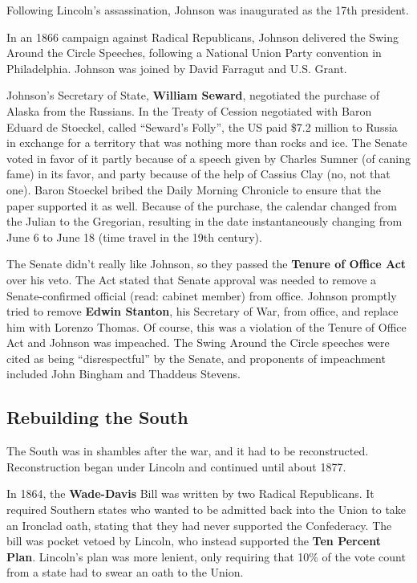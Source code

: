 Following Lincoln's assassination, Johnson was inaugurated as the 17th president.

In an 1866 campaign against Radical Republicans,
Johnson delivered the Swing Around the Circle Speeches,
following a National Union Party convention in Philadelphia.
Johnson was joined by David Farragut and U.S. Grant.

Johnson's Secretary of State, \textbf{William Seward}, negotiated the purchase of Alaska from the Russians.
In the Treaty of Cession negotiated with Baron Eduard de Stoeckel, called ``Seward's Folly'',
the US paid \$7.2 million to Russia in exchange for a territory that was nothing more than rocks and ice.
The Senate voted in favor of it
partly because of a speech given by Charles Sumner (of caning fame) in its favor,
and party because of the help of Cassius Clay (no, not that one).
Baron Stoeckel bribed the Daily Morning Chronicle to ensure that the paper supported it as well.
Because of the purchase, the calendar changed from the Julian to the Gregorian,
resulting in the date instantaneously changing from June 6 to June 18 (time travel in the 19th century).

The Senate didn't really like Johnson, so they passed the \textbf{Tenure of Office Act} over his veto.
The Act stated that Senate approval was needed to remove a Senate-confirmed official (read: cabinet member) from office.
Johnson promptly tried to remove \textbf{Edwin Stanton}, his Secretary of War, from office,
and replace him with Lorenzo Thomas.
Of course, this was a violation of the Tenure of Office Act and Johnson was impeached.
The Swing Around the Circle speeches were cited as being ``disrespectful'' by the Senate,
and proponents of impeachment included John Bingham and Thaddeus Stevens.

\subsection*{Rebuilding the South}

The South was in shambles after the war, and it had to be reconstructed.
Reconstruction began under Lincoln and continued until about 1877.

In 1864, the \textbf{Wade-Davis} Bill was written by two Radical Republicans.
It required Southern states who wanted to be admitted back into the Union to take an Ironclad oath,
stating that they had never supported the Confederacy.
The bill was pocket vetoed by Lincoln, who instead supported the \textbf{Ten Percent Plan}.
Lincoln's plan was more lenient,
only requiring that 10\% of the vote count from a state had to swear an oath to the Union.

